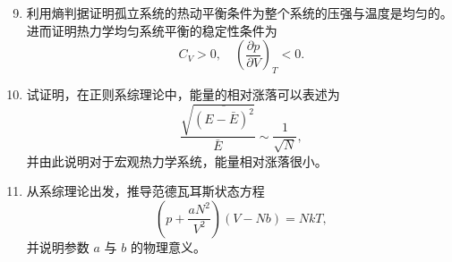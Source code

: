 \documentclass[12pt,a4paper,fontset=mac]{ctexart}
\newcommand{\đ}{\mathrm{đ}}
\newcommand{\calcanswer}{\vspace{8.5cm}}
\begin{document}
\begin{enumerate}
\setcounter{enumi}{8}
\item 利用熵判据证明孤立系统的热动平衡条件为整个系统的压强与温度是均匀的。进而证明热力学均匀系统平衡的稳定性条件为
\[
C_V > 0,\quad \left(\frac{\partial p}{\partial V}\right)_T < 0 .
\]
\calcanswer

\item 试证明，在正则系综理论中，能量的相对涨落可以表述为
\[
\frac{\sqrt{\overline{(E - \bar{E})^2}}}{\bar{E}} \sim \frac{1}{\sqrt{N}},
\]
并由此说明对于宏观热力学系统，能量相对涨落很小。
\calcanswer

\item 从系综理论出发，推导范德瓦耳斯状态方程
\[
\left(p + \frac{aN^2}{V^2}\right)(V - Nb) = NkT,
\]
并说明参数 $a$ 与 $b$ 的物理意义。
\calcanswer

\end{enumerate}
\end{document}
